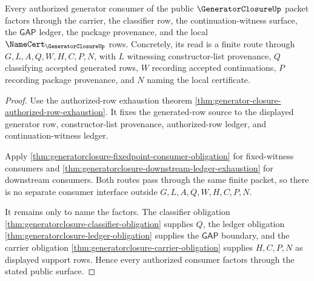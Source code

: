 \begin{theorem}
\label{thm:generatorclosure-authorized-consumer-factorization}
Every authorized generator consumer of the public $\GeneratorClosureUp$ packet factors through the carrier, the classifier row, the continuation-witness surface, the $\mathsf{GAP}$ ledger, the package provenance, and the local $\NameCert_{\GeneratorClosureUp}$ rows. Concretely, its read is a finite route through $G,L,A,Q,W,H,C,P,N$, with $L$ witnessing constructor-list provenance, $Q$ classifying accepted generated rows, $W$ recording accepted continuations, $P$ recording package provenance, and $N$ naming the local certificate.
\end{theorem}
\begin{proof}
Use the authorized-row exhaustion theorem \autoref{thm:generator-closure-authorized-row-exhaustion}. It fixes the generated-row source to the displayed generator row, constructor-list provenance, authorized-row ledger, and continuation-witness ledger.

Apply \autoref{thm:generatorclosure-fixedpoint-consumer-obligation} for fixed-witness consumers and \autoref{thm:generatorclosure-downstream-ledger-exhaustion} for downstream consumers. Both routes pass through the same finite packet, so there is no separate consumer interface outside $G,L,A,Q,W,H,C,P,N$.

It remains only to name the factors. The classifier obligation \autoref{thm:generatorclosure-classifier-obligation} supplies $Q$, the ledger obligation \autoref{thm:generatorclosure-ledger-obligation} supplies the $\mathsf{GAP}$ boundary, and the carrier obligation \autoref{thm:generatorclosure-carrier-obligation} supplies $H,C,P,N$ as displayed support rows. Hence every authorized consumer factors through the stated public surface.
\end{proof}

